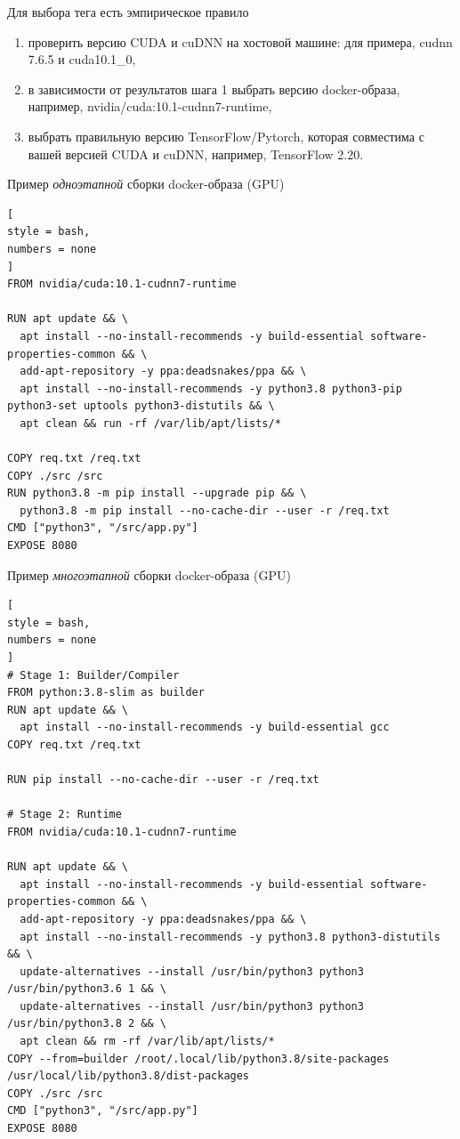 \documentclass[%
	11pt,
	a4paper,
	utf8,
		]{article}
\begin{document}
Для выбора тега есть эмпирическое правило
\begin{enumerate}
	\item проверить версию CUDA и cuDNN на хостовой машине: для примера, cudnn 7.6.5 и cuda10.1\_0,
	
	\item в зависимости от результатов шага 1 выбрать версию docker-образа, например, nvidia/cuda:10.1-cudnn7-runtime,
	
	\item выбрать правильную версию TensorFlow/Pytorch, которая совместима с вашей версией CUDA и cuDNN, например, TensorFlow 2.20. 
\end{enumerate}

Пример \emph{одноэтапной} сборки docker-образа (GPU)
\begin{lstlisting}[
style = bash,
numbers = none	
]
FROM nvidia/cuda:10.1-cudnn7-runtime

RUN apt update && \
  apt install --no-install-recommends -y build-essential software-properties-common && \
  add-apt-repository -y ppa:deadsnakes/ppa && \
  apt install --no-install-recommends -y python3.8 python3-pip python3-set uptools python3-distutils && \
  apt clean && run -rf /var/lib/apt/lists/*
  
COPY req.txt /req.txt
COPY ./src /src
RUN python3.8 -m pip install --upgrade pip && \
  python3.8 -m pip install --no-cache-dir --user -r /req.txt
CMD ["python3", "/src/app.py"]
EXPOSE 8080
\end{lstlisting}

Пример \emph{многоэтапной} сборки docker-образа (GPU)
\begin{lstlisting}[
style = bash,
numbers = none	
]
# Stage 1: Builder/Compiler
FROM python:3.8-slim as builder
RUN apt update && \
  apt install --no-install-recommends -y build-essential gcc
COPY req.txt /req.txt

RUN pip install --no-cache-dir --user -r /req.txt

# Stage 2: Runtime
FROM nvidia/cuda:10.1-cudnn7-runtime

RUN apt update && \
  apt install --no-install-recommends -y build-essential software-properties-common && \
  add-apt-repository -y ppa:deadsnakes/ppa && \
  apt install --no-install-recommends -y python3.8 python3-distutils && \
  update-alternatives --install /usr/bin/python3 python3 /usr/bin/python3.6 1 && \
  update-alternatives --install /usr/bin/python3 python3 /usr/bin/python3.8 2 && \
  apt clean && rm -rf /var/lib/apt/lists/*
COPY --from=builder /root/.local/lib/python3.8/site-packages /usr/local/lib/python3.8/dist-packages
COPY ./src /src
CMD ["python3", "/src/app.py"]
EXPOSE 8080
\end{lstlisting}
\end{document}
